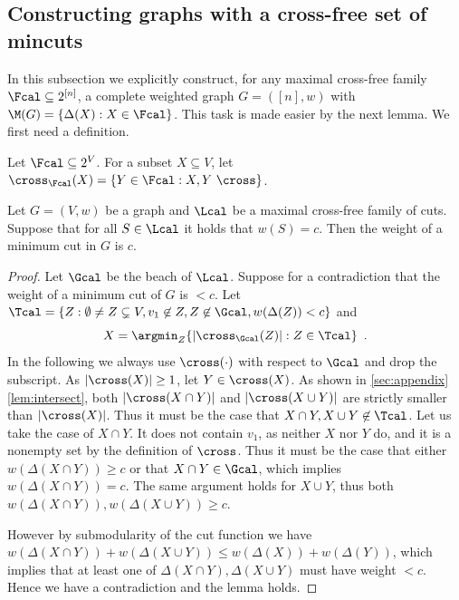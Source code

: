 \subsection{Constructing graphs with a cross-free set of mincuts}
\label{subsec:construction}
In this subsection we explicitly construct, for any maximal cross-free family $\Fcal \subseteq 2^{[n]}$, a complete weighted graph $G = ([n],w)$
with $\M(G) = \{ \Delta(X) : X \in \Fcal\}$.  This task is made easier by the next lemma.  We first need a definition.

\begin{definition}
\label{def:overlap}
Let $\Fcal \subseteq 2^{V}$.  For a subset $X \subseteq V$, let $\cross_{\Fcal}(X) = \{Y \in \Fcal: X, Y \ \cross\}$.
\end{definition}

\begin{lemma}
\label{lem:min_value}
Let $G = (V,w)$ be a graph and $\Lcal$ be a maximal cross-free family of cuts.  Suppose that for all
$S \in \Lcal$ it holds that $w(S) = c$.  Then the weight of a minimum cut in $G$ is $c$.
\end{lemma}

\begin{proof}
Let $\Gcal$ be the beach of $\Lcal$.  Suppose for a contradiction that the weight of a minimum cut of $G$ is $< c$.
Let $\Tcal = \{ Z : \emptyset \ne Z \subsetneq V, v_1 \not \in Z, Z \not \in \Gcal, w(\Delta(Z)) < c\}$ and
\[
X = \argmin_{Z} \{|\cross_\Gcal(Z)|: Z \in \Tcal \} \enspace .
\]
In the following we always use $\cross(\cdot)$ with respect to $\Gcal$ and
drop the subscript.  As $|\cross(X)| \ge 1$, let $Y \in \cross(X)$.  As shown in \cref{sec:appendix} \cref{lem:intersect}, both
$|\cross(X \cap Y)|$ and $|\cross(X \cup Y)|$ are strictly smaller than $|\cross(X)|$.  Thus it must be the case that
$X \cap Y, X \cup Y \not \in \Tcal$.  Let us take the case of $X \cap Y$.  It does not contain $v_1$, as neither $X$ nor $Y$ do,
and it is a nonempty set by the definition of $\cross$.  Thus it must be the case that either $w(\Delta(X \cap Y)) \ge c$ or
that $X \cap Y \in \Gcal$, which implies $w(\Delta(X \cap Y)) = c$.  The same argument holds for $X \cup Y$, thus
both $w(\Delta(X \cap Y)), w(\Delta(X \cup Y)) \ge c$.

However by submodularity of the cut function we have
$w(\Delta(X\cap Y )) + w(\Delta(X \cup Y)) \le w(\Delta(X)) + w(\Delta(Y))$, which implies that at least one of $\Delta(X \cap Y), \Delta(X \cup Y)$ must have weight $<c$.
Hence we have a contradiction and the lemma holds.
\end{proof}

